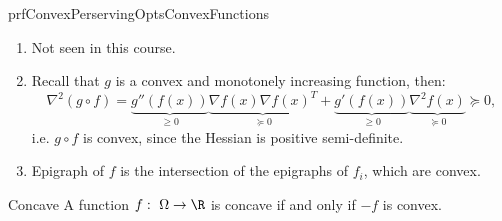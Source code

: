 \begin{prf}{prfConvexPerservingOptsConvexFunctions}
    \begin{enumerate}
        \item 
            Not seen in this course.
        \item 
            Recall that $g$ is a convex and monotonely increasing function, then: 
            \begin{equation*}
                \nabla^2 (g \circ f) = \underbrace{g''(f(x))}_{\geq 0} \underbrace{\nabla f(x) \nabla {f(x)}^T }_{\succeq 0} + \underbrace{g'(f(x))}_{\geq 0} \underbrace{\nabla^2 f(x)}_{\succeq 0} \succeq 0,
            \end{equation*}
            i\@.e\@. $g \circ f$ is convex, since the Hessian is positive semi-definite.
        \item 
            Epigraph of $f$ is the intersection of the epigraphs of $f_i$, which are convex.
    \end{enumerate}
    \vspace*{-0.2cm}
\end{prf}

\begin{theo}{Concave}
    A function $f: \ \Omega \rightarrow \R$ is concave if and only if $-f$ is convex.
\end{theo}



